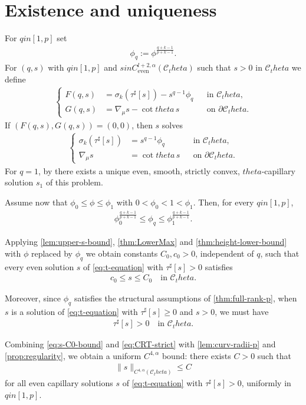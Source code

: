 \documentclass[12pt]{amsart}
\def\theta{theta}%
\def\in{in }%
\numberwithin{equation}{section}
\newcommand{\8}{\infty}
\newcommand{\cC}{\mathcal{C}}
\newcommand{\eq}[1]{\begin{equation}\begin{alignedat}{2}#1\end{alignedat}\end{equation}}
\newcommand{\Cth}{\cC_\theta}
\begin{document}
\section{Existence and uniqueness}\label{sec:existence-uniqueness}
For $q\in[1,p]$ set
\eq{
  \phi_q := \phi^{\frac{q+k-1}{p+k-1}}.
}
For $(q,s)$ with $q\in[1,p]$ and $s\in C^{l+2,\alpha}_{\mathrm{even}}(\Cth)$ such that $s>0$ in $\Cth$ we define
\eq{\label{eq:def-F-q}
\left\{
\begin{aligned}
  F(q,s) &= \sigma_k(\tau^\sharp[s]) - s^{q-1}\phi_q &&\text{in }\Cth,\\
  G(q,s) &= \nabla_{\mu}s - \cot\theta\,s
    &&\text{on }\partial\Cth.
\end{aligned}
\right.
}
If $(F(q,s),G(q,s))=(0,0)$, then $s$ solves
\eq{\label{eq:t-equation}
\left\{
\begin{aligned}
  \sigma_k(\tau^\sharp[s])
    &= s^{q-1} \phi_q
    &&\text{in }\Cth,\\
  \nabla_\mu s &= \cot\theta\,s
    &&\text{on }\partial\Cth.
\end{aligned}
\right.
}
For $q=1$, by \cite[Thm. 1.2]{HIS25} there exists a unique even, smooth, strictly convex, $\theta$-capillary solution
$s_1$ of this problem.

Assume now that $\phi_0\leq \phi\leq \phi_1$ with $0<\phi_0<1<\phi_1$. Then, for every
$q\in[1,p]$,
\eq{
  \phi_0^{\frac{q+k-1}{p+k-1}}
  \le
  \phi_q
  \le
  \phi_1^{\frac{q+k-1}{p+k-1}}.
}

Applying \autoref{lem:upper-s-bound}, \autoref{thm:LowerMax} and
\autoref{thm:height-lower-bound} with $\phi$ replaced by $\phi_q$ we obtain constants
$C_0,c_0>0$, independent of $q$, such that every even solution $s$ of
\eqref{eq:t-equation} with $\tau^\sharp[s]> 0$ satisfies
\eq{\label{eq:s-C0-bound}
  c_0 \le s \le C_0 \quad\text{in }\Cth.
}

Moreover, since $\phi_q$ satisfies the structural assumptions of \autoref{thm:full-rank-p}, when $s$ is a solution of \eqref{eq:t-equation} with $\tau^\sharp[s]\ge 0$ and $s>0$, we must have
\eq{\label{eq:CRT-strict}
  \tau^\sharp[s]>0 \quad\text{in }\Cth.
}

Combining \eqref{eq:s-C0-bound} and \eqref{eq:CRT-strict} with \autoref{lem:curv-radii-p} and
\autoref{prop:regularity}, we obtain a uniform $C^{4,\alpha}$ bound: there exists $C>0$ such that
\eq{\label{eq:C4a-bound-sol}
  \|s\|_{C^{4,\alpha}(\Cth)} \le C
}
for all even capillary solutions $s$ of \eqref{eq:t-equation} with $\tau^\sharp[s]>0$, uniformly in $q\in[1,p]$.
\end{document}
